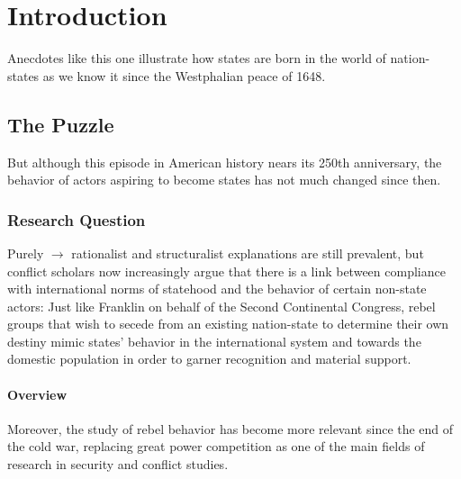 \documentclass[12pt]{article} %
\begin{document}

\tableofcontents %

\pagebreak

\listoftables

\listoffigures

\newpage %

\section{Introduction}

\noindent Anecdotes like this one illustrate how states are born in the world of nation-states as we know it since the Westphalian peace of 1648. 

\subsection{The Puzzle}

But although this episode in American history nears its 250th anniversary, the behavior of actors aspiring to become states has not much changed since then. 

\subsubsection{Research Question}

Purely $\rightarrow$ rationalist and structuralist explanations are still prevalent, but conflict scholars now increasingly argue that there is a link between compliance with international norms of statehood and the behavior of certain non-state actors: Just like Franklin on behalf of the Second Continental Congress, rebel groups that wish to secede from an existing nation-state to determine their own destiny mimic states' behavior in the international system and towards the domestic population in order to garner recognition and material support. 

\paragraph{Overview}

Moreover, the study of rebel behavior has become more relevant since the end of the cold war, replacing great power competition as one of the main fields of research in security and conflict studies. 
\end{document}
